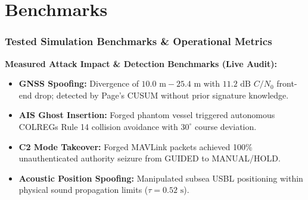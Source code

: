 \documentclass{beamer}
\begin{document}
\section{Benchmarks}
\begin{frame}
\frametitle{\textbf{Tested Simulation Benchmarks \& Operational Metrics}}

\centering
{}

\vspace{0.25cm}
\raggedright
\footnotesize
\textbf{Measured Attack Impact \& Detection Benchmarks (Live Audit):}
\begin{itemize}
    \setlength\itemsep{0.15em}
    \item \textbf{GNSS Spoofing:} Divergence of $10.0\text{ m} - 25.4\text{ m}$ with $11.2\text{ dB}$ $C/N_0$ front-end drop; detected by Page's CUSUM without prior signature knowledge.
    \item \textbf{AIS Ghost Insertion:} Forged phantom vessel triggered autonomous COLREGs Rule 14 collision avoidance with $30^\circ$ course deviation.
    \item \textbf{C2 Mode Takeover:} Forged MAVLink packets achieved 100\% unauthenticated authority seizure from GUIDED to MANUAL/HOLD.
    \item \textbf{Acoustic Position Spoofing:} Manipulated subsea USBL positioning within physical sound propagation limits ($\tau = 0.52\text{ s}$).
\end{itemize}
\end{frame}
\end{document}
